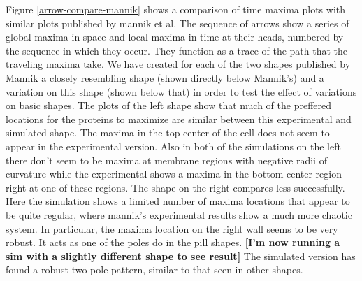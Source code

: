 \documentclass[letterpaper,twocolumn,amsmath,amssymb,pre]{revtex4-1}
\newcommand{\red}[1]{{\bf \color{red} #1}}
\newcommand{\fixme}[1]{\red{[#1]}}
\begin{document}
Figure \ref{arrow-compare-mannik} shows a comparison of time maxima
plots with similar plots published by mannik et al.  The sequence of
arrows show a series of global maxima in space and local maxima in
time at their heads, numbered by the sequence in which they occur.
They function as a trace of the path that the traveling maxima take.
We have created for each of the two shapes published by Mannik a
closely resembling shape (shown directly below Mannik's) and a
variation on this shape (shown below that) in order to test the effect
of variations on basic shapes.  The plots of the left shape show that
much of the preffered locations for the proteins to maximize are
similar between this experimental and simulated shape.  The maxima in
the top center of the cell does not seem to appear in the experimental
version.  Also in both of the simulations on the left there don't seem
to be maxima at membrane regions with negative radii of curvature
while the experimental shows a maxima in the bottom center region
right at one of these regions.  The shape on the right compares less
successfully.  Here the simulation shows a limited number of maxima
locations that appear to be quite regular, where mannik's experimental
results show a much more chaotic system.  In particular, the maxima
location on the right wall seems to be very robust.  It acts as one of
the poles do in the pill shapes.  \fixme{I'm now running a sim with a
  slightly different shape to see result} The simulated version has
found a robust two pole pattern, similar to that seen in other shapes.
\end{document}
